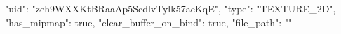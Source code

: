{
    "uid": "zeh9WXXKtBRaaAp5ScdlvTylk57aeKqE",
    "type": "TEXTURE_2D",
    "has_mipmap": true,
    "clear_buffer_on_bind": true,
    "file_path": ""
}